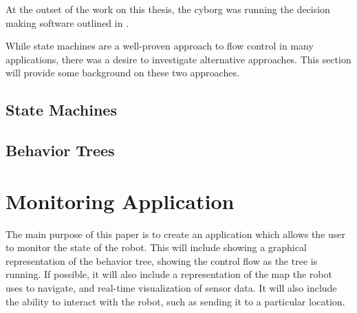\documentclass[\rootfolder/main.tex]{subfiles}
\begin{document}
At the outset of the work on this thesis, the cyborg was running the decision making software outlined in \cite{Andersen2017}.

While state machines are a well-proven approach to flow control in many applications, there was a desire to investigate alternative approaches.
This section will provide some background on these two approaches.

\subsection{State Machines} \label{sec:statemachines}


\subsection{Behavior Trees} \label{sec:behaviortrees}


\section{Monitoring Application}

The main purpose of this paper is to create an application which allows the user to monitor the state of the robot.
This will include showing a graphical representation of the behavior tree, showing the control flow as the tree is running.
If possible, it will also include a representation of the map the robot uses to navigate, and real-time visualization of sensor data.
It will also include the ability to interact with the robot, such as sending it to a particular location.
\end{document}
